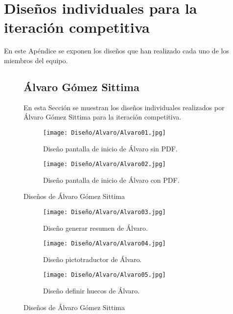 \chapter{Diseños individuales para la iteración competitiva}
\label{cap:anexo}

En este Apéndice se exponen los diseños que han realizado cada uno de los miembros del equipo.

\begin{figure}[ht!]
  \section{Álvaro Gómez Sittima}
  En esta Sección se muestran los diseños individuales realizados por Álvaro Gómez Sittima para la iteración competitiva.
  \label{sec:disenyoAlvaro}
  \begin{subfigure}{\textwidth}
    \centering
    \texttt{[image: Diseño/Alvaro/Alvaro01.jpg]}
    \caption{Diseño pantalla de inicio de Álvaro sin PDF.}
    \label{fig:disenyoAlvaro01}
  \end{subfigure}

  \begin{subfigure}{\textwidth}
    \centering
    \texttt{[image: Diseño/Alvaro/Alvaro02.jpg]}
    \caption{Diseño pantalla de inicio de Álvaro con PDF.}
    \label{fig:disenyoAlvaro02}
  \end{subfigure}
  \caption{Diseños de Álvaro Gómez Sittima}
  \label{fig:disenyoAlvaro}
\end{figure}

\begin{figure}[ht!]
  \ContinuedFloat

  \begin{subfigure}{\textwidth}
    \centering
    \texttt{[image: Diseño/Alvaro/Alvaro03.jpg]}
    \caption{Diseño generar resumen de Álvaro.}
    \label{fig:disenyoAlvaro03}
  \end{subfigure}

  \begin{subfigure}{\textwidth}
    \centering
    \texttt{[image: Diseño/Alvaro/Alvaro04.jpg]}
    \caption{Diseño pictotraductor de Álvaro.}
    \label{fig:disenyoAlvaro04}
  \end{subfigure}

  \begin{subfigure}{\textwidth}
    \centering
    \texttt{[image: Diseño/Alvaro/Alvaro05.jpg]}
    \caption{Diseño definir huecos de Álvaro.}
    \label{fig:disenyoAlvaro05}
  \end{subfigure}

  \caption{Diseños de Álvaro Gómez Sittima}
  \label{fig:disenyoAlvaro}
\end{figure}


